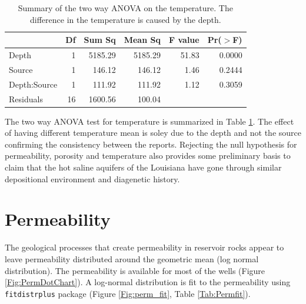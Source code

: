 \documentclass[review,authoryear, 12pt]{elsarticle}\usepackage[]{graphicx}\usepackage[]{color}
\begin{document}
\begin{table}[ht]
\centering
\begin{tabular}{lrrrrr}
  \hline
 & Df & Sum Sq & Mean Sq & F value & Pr($>$F) \\ 
  \hline
Depth        & 1 & 5185.29 & 5185.29 & 51.83 & 0.0000 \\ 
  Source       & 1 & 146.12 & 146.12 & 1.46 & 0.2444 \\ 
  Depth:Source & 1 & 111.92 & 111.92 & 1.12 & 0.3059 \\ 
  Residuals    & 16 & 1600.56 & 100.04 &  &  \\ 
   \hline
\end{tabular}
\caption{Summary of the two way ANOVA on the temperature. The difference in the temperature is caused by the depth.} 
\label{Tab:temp_anova}
\end{table}


The two way ANOVA test for temperature is summarized in Table \ref{Tab:temp_anova}. The effect of having different temperature mean is soley due to the depth and not the source confirming the consistency between the reports. Rejecting the null hypothesis for permeability, porosity and temperature also provides some preliminary basis to claim that the hot saline aquifers of the Louisiana have gone through similar depositional environment and diagenetic history.


\section{Permeability}
The geological processes that create permeability in reservoir rocks appear to leave permeability distributed around the geometric mean (log normal distribution). The permeability is available for most of the wells (Figure \ref{Fig:PermDotChart}). A log-normal distribution is fit to the permeability using \texttt{fitdistrplus} package (Figure \ref{Fig:perm_fit}, Table \ref{Tab:Permfit}).
\end{document}
